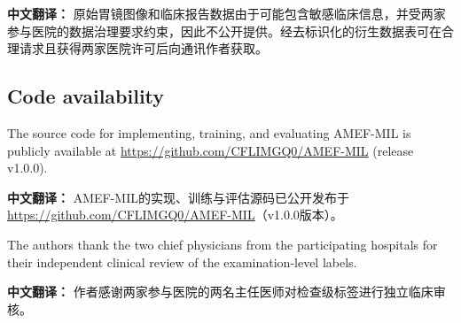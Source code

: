 \documentclass[Afour,sagev,times]{sagej}
\begin{document}
\textbf{中文翻译：} 原始胃镜图像和临床报告数据由于可能包含敏感临床信息，并受两家参与医院的数据治理要求约束，因此不公开提供。经去标识化的衍生数据表可在合理请求且获得两家医院许可后向通讯作者获取。

\subsection*{Code availability}

The source code for implementing, training, and evaluating AMEF-MIL is publicly available at \href{https://github.com/CFLIMGQ0/AMEF-MIL}{https://github.com/CFLIMGQ0/AMEF-MIL} (release v1.0.0).

\textbf{中文翻译：} AMEF-MIL的实现、训练与评估源码已公开发布于\href{https://github.com/CFLIMGQ0/AMEF-MIL}{https://github.com/CFLIMGQ0/AMEF-MIL}（v1.0.0版本）。

\begin{acks}
The authors thank the two chief physicians from the participating hospitals for their independent clinical review of the examination-level labels.
\end{acks}

\textbf{中文翻译：} 作者感谢两家参与医院的两名主任医师对检查级标签进行独立临床审核。
\end{document}
